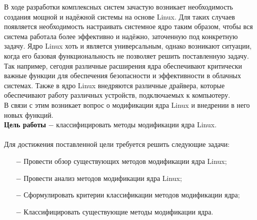 
В ходе разработки комплексных систем зачастую возникает необходимость создания мощной и надёжной системы на основе Linux.
Для таких случаев появляется необходимость настраивать системное ядро таким образом,
чтобы вся система работала более эффективно и надёжно, заточенную под конкретную задачу.
Ядро Linux хоть и является универсальным, однако возникают ситуации, когда его базовая функциональность не позволяет решить поставленную задачу.\\
Так например, сегодня различные расширения ядра обеспечивают критически важные
функции для обеспечения безопасности и эффективности в облачных системах\cite{cloud-kernel}.
Также в ядро Linux внедряются различные драйвера, которые обеспечивают работу различных устройств, подключаемых к компьютеру. \\
В связи с этим возникает вопрос о модификации ядра Linux и внедрении в него новых функций.
\vspace{0.1cm}
\\
\textbf{Цель работы} $-$ классифицировать методы модификации ядра Linux.
\\
\vspace{0.1cm}
\\
Для достижения поставленной цели требуется решить следующие задачи: %
\begin{itemize}
    \item[$-$] Провести обзор существующих методов модификации ядра Linux;
    \item[$-$] Провести анализ методов модификации ядра Linux;
    \item[$-$] Сформулировать критерии классификации методов модификации ядра;
    \item[$-$] Классифицировать существующие методы модификации ядра.
\end{itemize}
